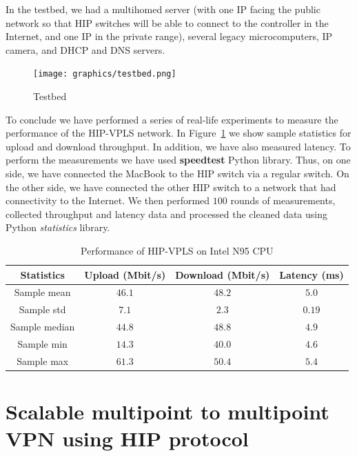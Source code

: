 In the testbed, we had a multihomed server (with one IP facing 
the public network so that HIP switches will be able to connect to 
the controller in the Internet, and one IP in the private range), 
several legacy microcomputers, IP camera, and DHCP and DNS servers.

\begin{figure}[!ht]
    \centering
    \texttt{[image: graphics/testbed.png]}
    \caption{Testbed}
    \label{fig:testbed}
\end{figure}

To conclude we have performed a series of real-life experiments to measure the 
performance of the HIP-VPLS network. In Figure~\ref{tab:vpls-performance} we show
sample statistics for upload and download throughput. In addition, we have also
measured latency. To perform the measurements we have used {\bf speedtest}
Python library. Thus, on one side, we have connected the MacBook to the HIP switch via a regular
switch. On the other side, we have connected the other HIP switch to a network 
that had connectivity to the Internet. We then performed $100$ rounds of measurements,
collected throughput and latency data and processed the cleaned data using Python
{\it statistics} library.

\begin{table}
    \centering
    \begin{tabular}{|c|c|c|c|}
    \hline
    Statistics     & Upload (Mbit/s)        & Download (Mbit/s)     & Latency (ms) \\\hline
    Sample mean    & $46.1$                  & $48.2$                 & $5.0$         \\
    Sample std     & $7.1$                   & $2.3$                  & $0.19$        \\
    Sample median  & $44.8$                  & $48.8$                 & $4.9$         \\
    Sample min     & $14.3$                  & $40.0$                 & $4.6$         \\
    Sample max     & $61.3$                  & $50.4$                 & $5.4$         \\
    \hline
    \end{tabular}
    \caption{Performance of HIP-VPLS on Intel N95 CPU}  
    \label{tab:vpls-performance}
\end{table}

\section{Scalable multipoint to multipoint VPN using HIP protocol}

